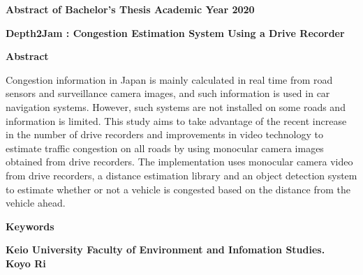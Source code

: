 \begin{center}
\textbf{\large Abstract of Bachelor's Thesis Academic Year 2020}

\vspace{6mm}

\textbf{\large Depth2Jam : Congestion Estimation System Using a Drive Recorder}

\end{center}

\vspace{10mm}


\begin{flushleft}
\textbf{Abstract}\\
\end{flushleft}
Congestion information in Japan is mainly calculated in real time from road sensors and surveillance camera images, and such information is used in car navigation systems. However, such systems are not installed on some roads and information is limited. This study aims to take advantage of the recent increase in the number of drive recorders and improvements in video technology to estimate traffic congestion on all roads by using monocular camera images obtained from drive recorders. The implementation uses monocular camera video from drive recorders, a distance estimation library and an object detection system to estimate whether or not a vehicle is congested based on the distance from the vehicle ahead.

\begin{flushleft}
\textbf{Keywords}\\
\textbf{}
\end{flushleft}

\begin{flushright}
\textbf{Keio University Faculty of Environment and Infomation Studies.}\\
\textbf{Koyo Ri}\\
\end{flushright}
